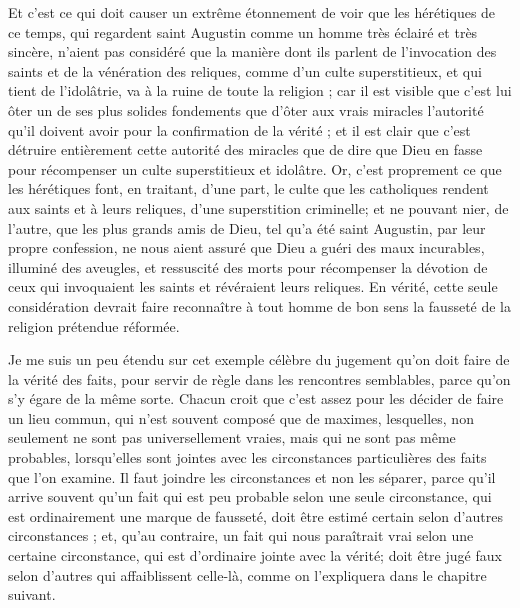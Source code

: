 Et c'est ce qui doit causer un extrême étonnement de voir que les hérétiques de ce temps, qui regardent saint Augustin comme un homme très éclairé et très sincère, n'aient pas considéré que la manière dont ils parlent de l'invocation des saints et de la vénération des reliques, comme d'un culte superstitieux, et qui tient de l'idolâtrie, va à la ruine de toute la religion ; car il est visible que c'est lui ôter un de ses plus solides fondements que d'ôter aux vrais miracles l'autorité qu'il doivent avoir pour la confirmation de la vérité ; et il est clair que c'est détruire entièrement cette autorité des miracles que de dire que Dieu en fasse pour récompenser un culte superstitieux et idolâtre. Or, c'est proprement ce que les hérétiques font, en traitant, d'une part, le culte que les catholiques rendent aux saints et à leurs reliques, d'une superstition criminelle; et ne pouvant nier, de l'autre, que les plus grands amis de Dieu, tel qu'a été saint Augustin, par leur propre confession, ne nous aient assuré que Dieu a guéri des maux incurables, illuminé des aveugles, et ressuscité des morts pour récompenser la dévotion de ceux qui invoquaient les saints et révéraient leurs reliques. En vérité, cette seule considération devrait faire reconnaître à tout homme de bon sens la fausseté de la religion prétendue réformée.

Je me suis un peu étendu sur cet exemple célèbre du jugement qu'on doit faire de la vérité des faits, pour servir de règle dans les rencontres semblables, parce qu'on s'y égare de la même sorte. Chacun croit que c'est assez pour les décider de faire un lieu commun, qui n'est souvent composé que de maximes, lesquelles, non seulement ne sont pas universellement vraies, mais qui ne sont pas même probables, lorsqu'elles sont jointes avec les circonstances particulières des faits que l'on examine. Il faut joindre les circonstances et non les séparer, parce qu'il arrive souvent qu'un fait qui est peu probable selon une seule circonstance, qui est ordinairement une marque de fausseté, doit être estimé certain selon d'autres circonstances ; et, qu'au contraire, un fait qui nous paraîtrait vrai selon une certaine circonstance, qui est d'ordinaire jointe avec la vérité; doit être jugé faux selon d'autres qui affaiblissent celle-là, comme on l'expliquera dans le chapitre suivant.

